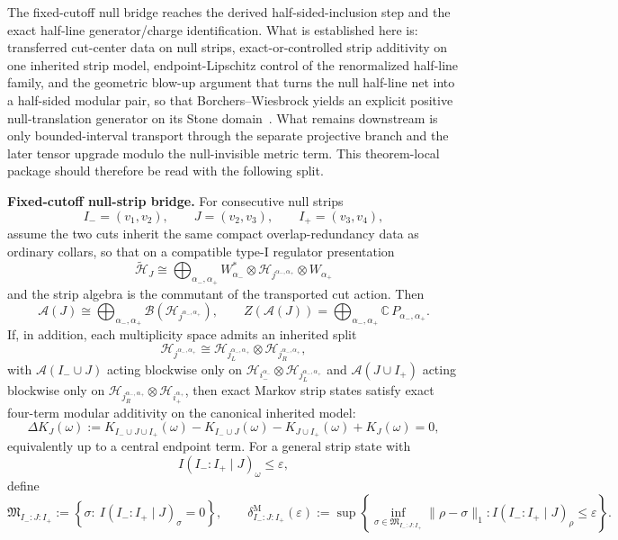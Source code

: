 The fixed-cutoff null bridge reaches the derived half-sided-inclusion step and the exact half-line generator/charge identification. What is established here is: transferred cut-center data on null strips, exact-or-controlled strip additivity on one inherited strip model, endpoint-Lipschitz control of the renormalized half-line family, and the geometric blow-up argument that turns the null half-line net into a half-sided modular pair, so that Borchers--Wiesbrock yields an explicit positive null-translation generator on its Stone domain~\cite{wiesbrock93}. What remains downstream is only bounded-interval transport through the separate projective branch and the later tensor upgrade modulo the null-invisible metric term. This theorem-local package should therefore be read with the following split.

\textbf{Fixed-cutoff null-strip bridge.} For consecutive null strips
\[
I_-=(v_1,v_2),\qquad
J=(v_2,v_3),\qquad
I_+=(v_3,v_4),
\]
assume the two cuts inherit the same compact overlap-redundancy data as ordinary collars, so that on a compatible type-I regulator presentation
\[
\tilde{\mathcal H}_{J}
\cong
\bigoplus_{\alpha_-,\alpha_+}
W_{\alpha_-}^{*}\otimes
\mathcal H_{j^{\alpha_-,\alpha_+}}\otimes
W_{\alpha_+}
\]
and the strip algebra is the commutant of the transported cut action. Then
\[
\mathcal A(J)
\cong
\bigoplus_{\alpha_-,\alpha_+}
\mathcal B(\mathcal H_{j^{\alpha_-,\alpha_+}}),
\qquad
Z(\mathcal A(J))
=
\bigoplus_{\alpha_-,\alpha_+}\mathbb C\,P_{\alpha_-,\alpha_+}.
\]
If, in addition, each multiplicity space admits an inherited split
\[
\mathcal H_{j^{\alpha_-,\alpha_+}}
\cong
\mathcal H_{j_L^{\alpha_-,\alpha_+}}
\otimes
\mathcal H_{j_R^{\alpha_-,\alpha_+}},
\]
with \(\mathcal A(I_-\cup J)\) acting blockwise only on
\(\mathcal H_{i_-^{\alpha_-}}\otimes \mathcal H_{j_L^{\alpha_-,\alpha_+}}\)
and \(\mathcal A(J\cup I_+)\) acting blockwise only on
\(\mathcal H_{j_R^{\alpha_-,\alpha_+}}\otimes \mathcal H_{i_+^{\alpha_+}}\),
then exact Markov strip states satisfy exact four-term modular additivity on the canonical inherited model:
\[
\Delta K_J(\omega)
:=
K_{I_-\cup J\cup I_+}(\omega)-K_{I_-\cup J}(\omega)-K_{J\cup I_+}(\omega)+K_J(\omega)
=0,
\]
equivalently up to a central endpoint term. For a general strip state with
\[
I(I_-:I_+\mid J)_\omega\le \varepsilon,
\]
define
\[
\mathfrak M_{I_-:J:I_+}
:=
\left\{
\sigma:\ I(I_-:I_+\mid J)_\sigma=0
\right\},
\qquad
\delta^{\mathrm M}_{I_-:J:I_+}(\varepsilon)
:=
\sup\left\{
\inf_{\sigma\in\mathfrak M_{I_-:J:I_+}}\|\rho-\sigma\|_1:
I(I_-:I_+\mid J)_\rho\le\varepsilon
\right\}.
\]
